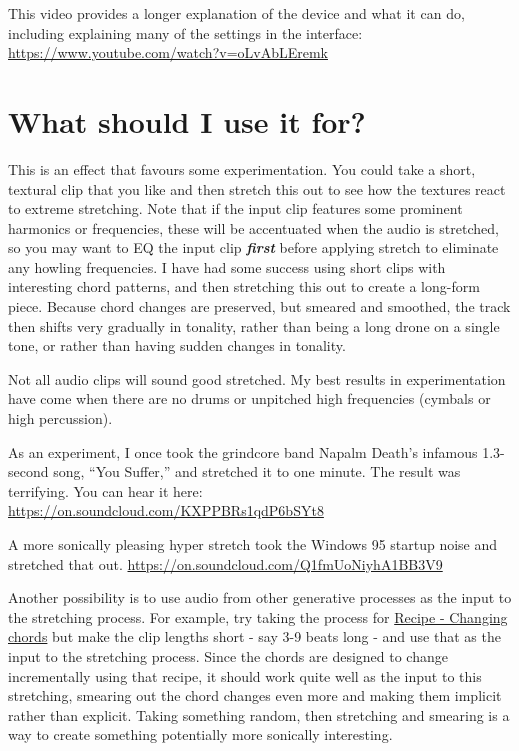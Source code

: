 \documentclass[
  12pt,
  letterpaper,
  oneside,
  open=any]{scrbook}
\begin{document}
This video provides a longer explanation of the device and what it can
do, including explaining many of the settings in the interface:
\url{https://www.youtube.com/watch?v=oLvAbLEremk}

\section{What should I use it for?}\label{what-should-i-use-it-for}

This is an effect that favours some experimentation. You could take a
short, textural clip that you like and then stretch this out to see how
the textures react to extreme stretching. Note that if the input clip
features some prominent harmonics or frequencies, these will be
accentuated when the audio is stretched, so you may want to EQ the input
clip \textbf{\emph{first}} before applying stretch to eliminate any
howling frequencies. I have had some success using short clips with
interesting chord patterns, and then stretching this out to create a
long-form piece. Because chord changes are preserved, but smeared and
smoothed, the track then shifts very gradually in tonality, rather than
being a long drone on a single tone, or rather than having sudden
changes in tonality.

Not all audio clips will sound good stretched. My best results in
experimentation have come when there are no drums or unpitched high
frequencies (cymbals or high percussion).

As an experiment, I once took the grindcore band Napalm Death's infamous
1.3-second song, ``You Suffer,'' and stretched it to one minute. The
result was terrifying. You can hear it here:
\url{https://on.soundcloud.com/KXPPBRs1qdP6bSYt8}

A more sonically pleasing hyper stretch took the Windows 95 startup
noise and stretched that out.
\url{https://on.soundcloud.com/Q1fmUoNiyhA1BB3V9}

Another possibility is to use audio from other generative processes as
the input to the stretching process. For example, try taking the process
for \hyperref[Chapter-001-Recipe-Changing_Chords]{Recipe - Changing
chords} but make the clip lengths short - say 3-9 beats long - and use
that as the input to the stretching process. Since the chords are
designed to change incrementally using that recipe, it should work quite
well as the input to this stretching, smearing out the chord changes
even more and making them implicit rather than explicit. Taking
something random, then stretching and smearing is a way to create
something potentially more sonically interesting.
\end{document}
